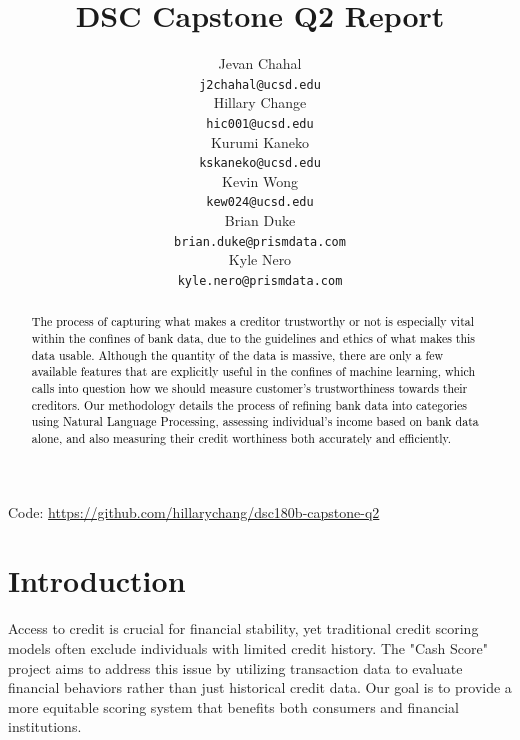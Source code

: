 \documentclass[12pt,letterpaper]{article}
\title{DSC Capstone Q2 Report}
\author{Jevan Chahal\\
  {\tt j2chahal@ucsd.edu} \\\And
  Hillary Change \\
  {\tt hic001@ucsd.edu} \\\And
  Kurumi Kaneko \\
  {\tt kskaneko@ucsd.edu} \\\And
  Kevin Wong \\
  {\tt kew024@ucsd.edu} \\\And
  Brian Duke \\
  {\tt brian.duke@prismdata.com} \\\And
  Kyle Nero \\
  {\tt kyle.nero@prismdata.com} \\}
\begin{document}
\maketitle


\begin{abstract}
    \textcolor{black}{
    The process of capturing what makes a creditor trustworthy or not is especially vital within the confines of bank data, due to the guidelines and ethics of what makes this data usable. Although the quantity of the data is massive, there are only a few available features that are explicitly useful in the confines of machine learning, which calls into question how we should measure customer's trustworthiness towards their creditors. Our methodology details the process of refining bank data into categories using Natural Language Processing, assessing individual's income based on bank data alone, and also measuring their credit worthiness both accurately and efficiently. 
    }
\end{abstract}

\begin{center}
Code: \url{https://github.com/hillarychang/dsc180b-capstone-q2}
\end{center}

\maketoc
\clearpage

\section{Introduction}

Access to credit is crucial for financial stability, yet traditional credit scoring models often exclude individuals with limited credit history. The "Cash Score" project aims to address this issue by utilizing transaction data to evaluate financial behaviors rather than just historical credit data. Our goal is to provide a more equitable scoring system that benefits both consumers and financial institutions.
\end{document}
